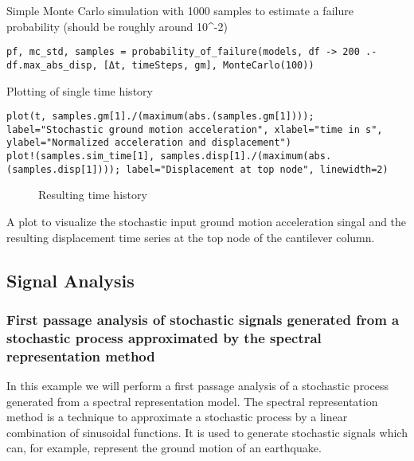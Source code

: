 Simple Monte Carlo simulation with 1000 samples to estimate a failure probability (should be roughly around 10{\textasciicircum}-2)




\begin{verbatim}
pf, mc_std, samples = probability_of_failure(models, df -> 200 .- df.max_abs_disp, [Δt, timeSteps, gm], MonteCarlo(100))
\end{verbatim}



Plotting of single time history




\begin{verbatim}
plot(t, samples.gm[1]./(maximum(abs.(samples.gm[1]))); label="Stochastic ground motion acceleration", xlabel="time in s", ylabel="Normalized acceleration and displacement")
plot!(samples.sim_time[1], samples.disp[1]./(maximum(abs.(samples.disp[1]))); label="Displacement at top node", linewidth=2)
\end{verbatim}



\begin{figure}
\centering
{}
\caption{Resulting time history}
\end{figure}
 A plot to visualize the stochastic input ground motion acceleration singal and the resulting displacement time series at the top node of the cantilever column.



\subsection{Signal Analysis}



\label{2703783626997087689}{}


\subsubsection{First passage analysis of stochastic signals generated from a stochastic process approximated by the spectral representation method}



\label{6920089283529822742}{}


In this example we will perform a first passage analysis of a stochastic process generated from a spectral representation model. The spectral representation method is a technique to approximate a stochastic process by a linear combination of sinusoidal functions. It is used to generate stochastic signals which can, for example, represent the ground motion of an earthquake.



